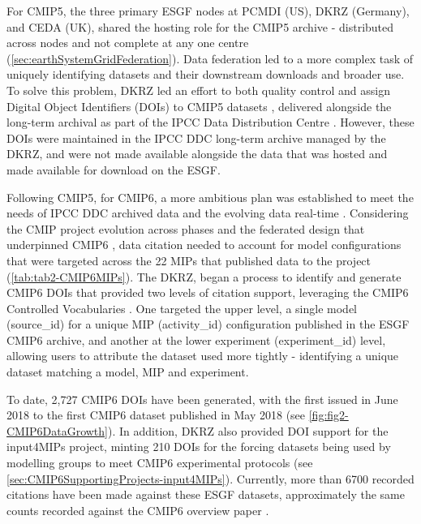 \documentclass[manuscript]{copernicus}
\begin{document}
For CMIP5, the three primary ESGF nodes at PCMDI (US), DKRZ (Germany), and CEDA (UK), shared the hosting role for the CMIP5 archive - distributed across nodes and not complete at any one centre (\autoref{sec:earthSystemGridFederation}). Data federation led to a more complex task of uniquely identifying datasets and their downstream downloads and broader use. To solve this problem, DKRZ led an effort to both quality control and assign Digital Object Identifiers (DOIs) to CMIP5 datasets \citep[\autoref{sec:IPCC-DDC};][]{stockhause_quality_2012}, delivered alongside the long-term archival as part of the IPCC Data Distribution Centre \citep[IPCC DDC, \autoref{sec:IPCC-DDC};][]{stockhause_twenty-five_2022}. However, these DOIs were maintained in the IPCC DDC long-term archive managed by the DKRZ, and were not made available alongside the data that was hosted and made available for download on the ESGF.

Following CMIP5, for CMIP6, a more ambitious plan was established to meet the needs of IPCC DDC archived data and the evolving data real-time \citep{stockhause_cmip6_2017}. Considering the CMIP project evolution across phases and the federated design that underpinned CMIP6 \citep[see \autoref{sec:cmip6ProjectDesign};][]{eyring_overview_2016}, data citation needed to account for model configurations that were targeted across the 22 MIPs that published data to the project (\autoref{tab:tab2-CMIP6MIPs}). The DKRZ, began a process to identify and generate CMIP6 DOIs that provided two levels of citation support, leveraging the CMIP6 Controlled Vocabularies \citep[see \autoref{sec:CMIPCVs};][]{durack_cmip6_2024}. One targeted the upper level, a single model (source\_id) for a unique MIP (activity\_id) configuration published in the ESGF CMIP6 archive, and another at the lower experiment (experiment\_id) level, allowing users to attribute the dataset used more tightly - identifying a unique dataset matching a model, MIP and experiment.

To date, 2,727 CMIP6 DOIs have been generated, with the first issued in June 2018 to the first CMIP6 dataset published in May 2018 (see \autoref{fig:fig2-CMIP6DataGrowth}). In addition, DKRZ also provided DOI support for the input4MIPs project, minting 210 DOIs for the forcing datasets being used by modelling groups to meet CMIP6 experimental protocols (see \autoref{sec:CMIP6SupportingProjects-input4MIPs}). Currently, more than 6700 recorded citations have been made against these ESGF datasets, approximately the same counts recorded against the CMIP6 overview paper \citep[see \autoref{sec:CMIP6Impact};][]{eyring_overview_2016}.
\end{document}
